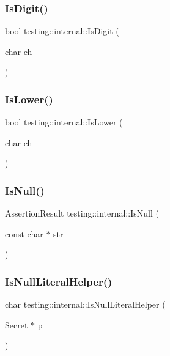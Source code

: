 \subsubsection{\texorpdfstring{IsDigit()}{IsDigit()}}
{\footnotesize\ttfamily bool testing\+::internal\+::\+Is\+Digit (\begin{DoxyParamCaption}\item[{char}]{ch }\end{DoxyParamCaption})\hspace{0.3cm}{\ttfamily [inline]}}

\mbox{\label{namespacetesting_1_1internal_ac26ce3883bc8919c27074975e958f3b7}} 
\subsubsection{\texorpdfstring{IsLower()}{IsLower()}}
{\footnotesize\ttfamily bool testing\+::internal\+::\+Is\+Lower (\begin{DoxyParamCaption}\item[{char}]{ch }\end{DoxyParamCaption})\hspace{0.3cm}{\ttfamily [inline]}}

\mbox{\label{namespacetesting_1_1internal_adcfd37a66bc4cb0e8291cf46e1a6c72b}} 
\subsubsection{\texorpdfstring{IsNull()}{IsNull()}}
{\footnotesize\ttfamily Assertion\+Result testing\+::internal\+::\+Is\+Null (\begin{DoxyParamCaption}\item[{const char $\ast$}]{str }\end{DoxyParamCaption})}

\mbox{\label{namespacetesting_1_1internal_afb0731ba39ffef1fa1730ac0699c9025}} 
\subsubsection{\texorpdfstring{IsNullLiteralHelper()}{IsNullLiteralHelper()}\hspace{0.1cm}{\footnotesize\ttfamily [1/2]}}
{\footnotesize\ttfamily char testing\+::internal\+::\+Is\+Null\+Literal\+Helper (\begin{DoxyParamCaption}\item[{Secret $\ast$}]{p }\end{DoxyParamCaption})}

